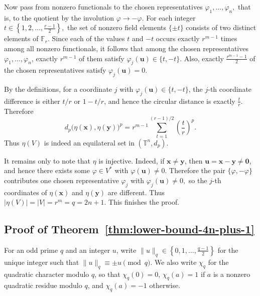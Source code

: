 \documentclass[11pt]{article}
\theoremstyle{definition}
\newcommand{\T}{\mathbb T}
\begin{document}
Now pass from nonzero functionals to the chosen representatives
\(
\varphi_1,\dots,\varphi_n,
\)
that is, to the quotient by the involution $\varphi\rightarrow -\varphi$. For each integer
\(
t\in\left\{1,2,\dots,\frac{r-1}{2}\right\},
\)
the set of nonzero field elements $\{\pm t\}$ consists of two distinct elements of $\mathbb F_r$.
Since each of the values $t$ and $-t$ occurs exactly $r^{m-1}$ times among all nonzero functionals, it follows that among the chosen representatives $\varphi_1,\dots,\varphi_n$, exactly
\(
r^{m-1}
\)
of them satisfy
\(
\varphi_j(\boldsymbol{u})\in\{t,-t\}.
\)
Also, exactly
\(
\frac{r^{m-1}-1}{2}
\)
of the chosen representatives satisfy
\(
\varphi_j(\boldsymbol{u})=0.
\)

By the definitions, for a coordinate $j$ with $\varphi_j(\boldsymbol{u})\in\{t,-t\}$, the $j$-th coordinate difference is either $t/r$ or $1-t/r$, and hence the circular distance is exactly
\(
\frac{t}{r}.
\)
Therefore
\[
d_p\bigl(\eta(\boldsymbol{x}),\eta(\boldsymbol{y})\bigr)^p
=
r^{m-1}\sum_{t=1}^{(r-1)/2}\left(\frac{t}{r}\right)^p.
\]
Thus $\eta(V)$ is indeed an equilateral set in $(\T^n,d_p)$.

It remains only to note that $\eta$ is injective. Indeed, if $\boldsymbol{x}\neq \boldsymbol{y}$, then $\boldsymbol{u}=\boldsymbol{x}-\boldsymbol{y}\neq \boldsymbol{0}$, and hence there exists some $\varphi\in V^*$ with $\varphi(\boldsymbol{u})\neq 0$.
Therefore the pair $\{\varphi,-\varphi\}$ contributes one chosen representative $\varphi_j$ with
\(
\varphi_j(\boldsymbol{u})\neq 0,
\)
so the $j$-th coordinates of $\eta(\boldsymbol{x})$ and $\eta(\boldsymbol{y})$ are different.
Thus
\(
|\eta(V)|=|V|=r^m=q=2n+1.
\)
This finishes the proof.




\subsection{Proof of Theorem~\ref{thm:lower-bound-4n-plus-1}}
For an odd prime \(q\) and an integer \(u\), write
\(
\|u\|_q\in\left\{0,1,\dots,\frac{q-1}{2}\right\}
\)
for the unique integer such that
\(
\|u\|_q\equiv \pm u \pmod q.
\)
We also write \(\chi_q\) for the quadratic character modulo \(q\), so that
\(\chi_q(0)=0\), \(\chi_q(a)=1\) if \(a\) is a nonzero quadratic residue
modulo \(q\), and \(\chi_q(a)=-1\) otherwise.
\end{document}
